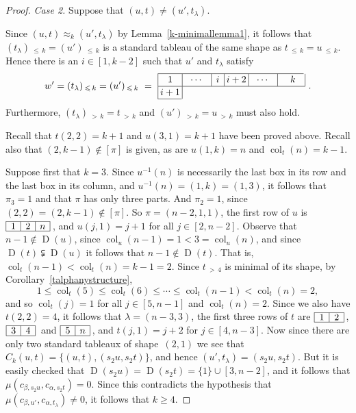 \documentclass[10pt]{amsart}
\theoremstyle{definition}
\newenvironment{Case}[1]{\smallskip\noindent\emph{Case #1}\endgraf
 \nobreak\noindent\ignorespaces}{\endgraf\smallskip}
\DeclareMathOperator{\col}{col}
\newcommand{\morethan}[2]{#1\,{_{>\,#2}}}
\newcommand{\Lessthan}[2]{#1\,{_{\leqslant\,#2}}}
\DeclareMathOperator{\D}{D}
\begin{document}
\begin{proof}
\begin{Case}{2. } Suppose that $(u,t)\neq(u',t_\lambda)$.

Since $(u,t)\approx_k(u',t_\lambda)$ by Lemma~\ref{k-minimallemma1}, it follows that
$\Lessthan {(t_\lambda)}{k}=\Lessthan {(u')}k$ is a standard tableau of the same shape as
$\Lessthan {t}{k}=\Lessthan {u}k$. Hence there is an $i\in[1,k-2]$
such that $u'$ and $t_\lambda$ satisfy
\[
w'=\Lessthan {(t_\lambda)}{k}=\Lessthan {(u')}k\ =\ \vcenter{\offinterlineskip\small
\hbox{\vrule height 0.4 pt depth0 pt width 152.4pt}
\hbox{\vrule height 9 pt depth 4 pt\hbox to 25pt{\hfil$1$\hfil}\vrule
\hbox to 30pt{\hfil$\cdots$\hfil}\vrule\hbox to 13pt{\hfil$i$\hfil}\vrule
\hbox to 25pt{\hfil$i+2$\hfil}\vrule\hbox to 30pt{\hfil$\cdots$\hfil}\vrule\
\hbox to 25pt{\hfil$k$\hfil}\vrule}
\hrule
\hbox{\vrule height 9 pt depth 4 pt\hbox to 25pt{\hfil$i+1$\hfil}\vrule}
\hrule width 25 pt}\ .
\]
Furthermore, $\morethan {(t_\lambda)}k=\morethan tk$ and $\morethan {(u')}k=\morethan uk$
must also hold.

Recall that $t(2,2)=k+1$ and $u(3,1)=k+1$ have been proved above. Recall also that
$(2,k-1)\notin[\pi]$ is given, as are $u(1,k)=n$ and $\col_t(n)=k-1$.

Suppose first that $k=3$. Since $u^{-1}(n)$ is necessarily the last box
in its row and the last box in its column, and $u^{-1}(n)=(1,k)=(1,3)$,
it follows that $\pi_3=1$ and that $\pi$ has only three parts. And $\pi_2=1$, since
$(2,2)=(2,k-1)\notin[\pi]$. So $\pi=(n-2,1,1)$, the first row of $u$ is
$\vcenter{\offinterlineskip
\hrule
\hbox{\vrule height 8 pt depth 2 pt\hbox to 15pt{\hfil$1$\hfil}\vrule
\hbox to 15pt{\hfil$2$\hfil}\vrule
\hbox to 15pt{\hfil$n$\hfil}\vrule}
\hrule}\,$,
and $u(j,1)=j+1$ for all $j\in[2, n-2]$. Observe that $n-1\notin\D(u)$, since
$\col_u(n-1)=1<3=\col_u(n)$, and since $\D(t)\subsetneqq\D(u)$ it follows
that $n-1\notin\D(t)$. That is, $\col_t(n-1)<\col_t(n)=k-1=2$. Since $\morethan t4$ is
minimal of its shape, by Corollary~\ref{talphanystructure},
\[
1\leqslant \col_t(5)\leqslant\col_t(6)\leqslant\cdots\leqslant\col_t(n-1)<\col_t(n)=2,
\]
and so $\col_t(j)=1$ for all $j\in[5,n-1]$ and $\col_t(n)=2$. Since we also
have $t(2,2)=4$, it follows that $\lambda=(n-3,3)$, the first three rows of $t$ are
$\vcenter{\offinterlineskip
\hrule
\hbox{\vrule height 8 pt depth 2 pt\hbox to 15pt{\hfil$1$\hfil}\vrule
\hbox to 15pt{\hfil$2$\hfil}\vrule}
\hrule}\,$,
$\vcenter{\offinterlineskip
\hrule
\hbox{\vrule height 8 pt depth 2 pt\hbox to 15pt{\hfil$3$\hfil}\vrule
\hbox to 15pt{\hfil$4$\hfil}\vrule}
\hrule}\,$
and
$\vcenter{\offinterlineskip
\hrule
\hbox{\vrule height 8 pt depth 2 pt\hbox to 15pt{\hfil$5$\hfil}\vrule
\hbox to 15pt{\hfil$n$\hfil}\vrule}
\hrule}\,$, and $t(j,1)=j+2$ for $j\in [4, n-3]$. Now since there are only
two standard tableaux of shape~$(2,1)$ we see that $C_k(u,t)=\{(u,t),(s_2u,s_2t)\}$,
and hence $(u',t_\lambda)=(s_2u,s_2t)$. But it is easily checked that
$\D(s_2u)=\D(s_2t)=\{1\}\cup[3,n-2]$, and it follows that
$\mu(c_{\beta,s_2u},c_{\alpha,s_2t})=0$. Since this contradicts the hypothesis
that $\mu(c_{\beta,u'},c_{\alpha,t_\lambda})\neq 0$, it follows that $k\geqslant 4$.


\end{Case}
\end{proof}
\end{document}
